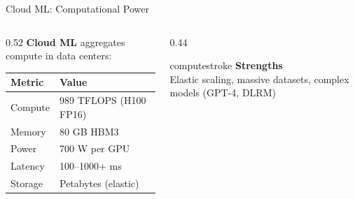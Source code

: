 \documentclass[aspectratio=169, 12pt]{beamer}
\begin{document}
\begin{frame}{Cloud ML: Computational Power}
\note{
%
%
%
%
%
}

\small
\begin{columns}[T]
  \begin{column}{0.52\textwidth}
    \textbf{Cloud ML} aggregates compute in data centers:

    \vspace{0.15cm}
    {\footnotesize
    \renewcommand{\arraystretch}{1.15}
    \begin{tabular}{@{}ll@{}}
      \toprule
      \textbf{Metric} & \textbf{Value} \\
      \midrule
      Compute    & 989 TFLOPS (H100 FP16) \\
      Memory     & 80 GB HBM3 \\
      Power      & 700 W per GPU \\
      Latency    & 100--1000+ ms \\
      Storage    & Petabytes (elastic) \\
      \bottomrule
    \end{tabular}
    }

    \vspace{0.15cm}
  \end{column}
  \begin{column}{0.44\textwidth}
    \vspace{0.2cm}
    \begin{mlsyscard}{computestroke}
    \textbf{Strengths}\\
    {\footnotesize Elastic scaling, massive datasets, complex models (GPT-4, DLRM)}
    \end{mlsyscard}


\end{column}
\end{columns}
\end{frame}
\end{document}
